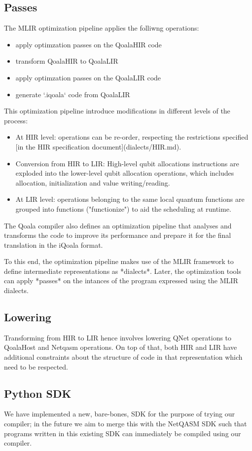 \subsection{Passes}
The MLIR optimization pipeline applies the folliwng operations:
\begin{itemize}
\item apply optimzation passes on the QoalaHIR code
\item transform QoalaHIR to QoalaLIR
\item apply optimzation passes on the QoalaLIR code
\item generate `.iqoala` code from QoalaLIR
\end{itemize}

This optimization pipeline introduce modifications in different levels of the process:
\begin{itemize}
\item At HIR level: operations can be re-order, respecting the restrictions specified
  [in the HIR specification document](dialects/HIR.md).
\item Conversion from HIR to LIR: High-level qubit allocations instructions are exploded
  into the lower-level qubit allocation operations, which includes allocation,
  initialization and value writing/reading.
\item At LIR level: operations belonging to the same local quantum functions are grouped
  into functions ("functionize") to aid the scheduling at runtime.
\end{itemize}


The Qoala compiler also defines an optimization pipeline that analyses and
transforms the code to improve its performance and prepare it for the final
translation in the iQoala format.

To this end, the optimization pipeline makes use of the MLIR framework to
define intermediate representations as *dialects*. Later, the optimization
tools can apply *passes* on the intances of the program expressed using the
MLIR dialects.


\subsection{Lowering}
Transforming from HIR to LIR hence involves lowering QNet operations to QoalaHost and Netqasm operations.
On top of that, both HIR and LIR have additional constraints about the structure of code in that representation which need to be respected.

\subsection{Python SDK}
We have implemented a new, bare-bones, SDK for the purpose of trying our compiler; in the future we aim to merge this with the NetQASM SDK such that programs written in this existing SDK can immediately be compiled using our compiler.

